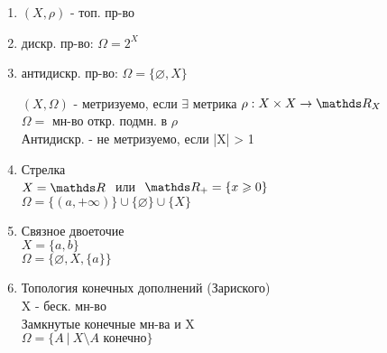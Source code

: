\documentclass[geometry.tex]{subfiles}
\begin{document}
  \begin{examples}
      \begin{enumerate}
          \item $(X, \rho)$ - топ. пр-во
          \item дискр. пр-во: $\Omega = 2^X$
          \item антидискр. пр-во: $\Omega = \{\varnothing, X\}$

      \begin{definition}
          $(X, \Omega)$ - метризуемо, если $\exists$ метрика $\rho: X \times X \rightarrow \R_X$\\
          $\Omega = $ мн-во откр. подмн. в $\rho$\\
          Антидискр. - не метризуемо, если |X| > 1
      \end{definition}
          \item Стрелка\\
                $X = \R  \ $ или $\   \R_+ = \{x \geq 0\}$\\
                $\Omega = \{(a, +\infty)\} \cup \{\varnothing\} \cup \{X\}$
          \item Связное двоеточие\\
                $X = \{a, b\}$\\
                $\Omega = \{\varnothing, X, \{a\}\}$
          \item Топология конечных дополнений (Зариского)\\
                X - беск. мн-во\\
                Замкнутые конечные мн-ва и X \\
                $\Omega = \{A \  | \  X \setminus A \text{ конечно}\}$
      \end{enumerate}
  \end{examples}
\end{document}
